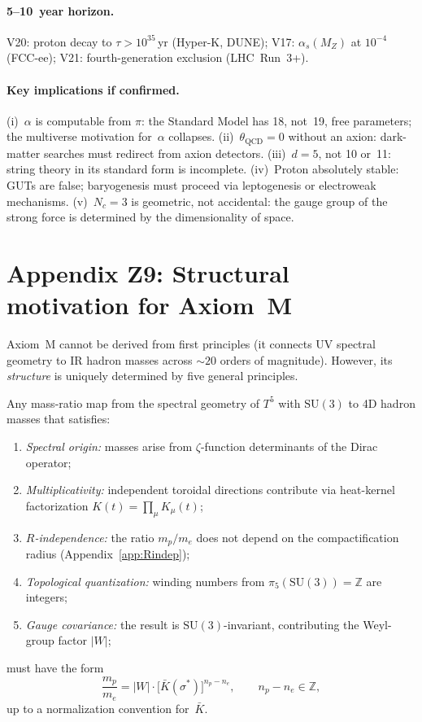 \paragraph{5--10~year horizon.}
V20: proton decay to $\tau>10^{35}\,$yr (Hyper-K, DUNE);
V17: $\alpha_s(M_Z)$ at $10^{-4}$ (FCC-ee);
V21: fourth-generation exclusion (LHC~Run~3+).

\paragraph{Key implications if confirmed.}
(i)~$\alpha$ is computable from $\pi$: the Standard Model has 18, not~19,
free parameters; the multiverse motivation for~$\alpha$ collapses.
(ii)~$\theta_{\mathrm{QCD}}=0$ without an axion: dark-matter searches
must redirect from axion detectors.
(iii)~$d=5$, not 10 or~11: string theory in its standard form is incomplete.
(iv)~Proton absolutely stable: GUTs are false; baryogenesis must proceed
via leptogenesis or electroweak mechanisms.
(v)~$N_c=3$ is geometric, not accidental: the gauge group of the strong
force is determined by the dimensionality of space.

\section{Appendix Z9: Structural motivation for Axiom~M}
\label{app:axiomM_structure}

Axiom~M cannot be derived from first principles (it connects UV spectral
geometry to IR hadron masses across $\sim\!20$ orders of magnitude).
However, its \emph{structure} is uniquely determined by five general
principles.

\begin{theorem}
\label{thm:axiomM_struct}
Any mass-ratio map from the spectral geometry of $T^5$ with $\mathrm{SU}(3)$
to 4D hadron masses that satisfies:
\begin{enumerate}[label=\upshape(P\arabic*),nosep]
\item \emph{Spectral origin:} masses arise from $\zeta$-function determinants
  of the Dirac operator;
\item \emph{Multiplicativity:} independent toroidal directions contribute via
  heat-kernel factorization $K(t)=\prod_\mu K_\mu(t)$;
\item \emph{$R$-independence:} the ratio $m_p/m_e$ does not depend on the
  compactification radius (Appendix~\ref{app:Rindep});
\item \emph{Topological quantization:} winding numbers from
  $\pi_5(\mathrm{SU}(3))=\mathbb{Z}$ are integers;
\item \emph{Gauge covariance:} the result is $\mathrm{SU}(3)$-invariant,
  contributing the Weyl-group factor $|W|$;
\end{enumerate}
must have the form
\begin{equation}\label{eq:axiomM_structure}
  \frac{m_p}{m_e}
  = |W|\cdot\bigl[\bar{K}(\sigma^*)\bigr]^{n_p-n_e},
  \qquad n_p-n_e\in\mathbb{Z},
\end{equation}
up to a normalization convention for~$\bar{K}$.
\end{theorem}

